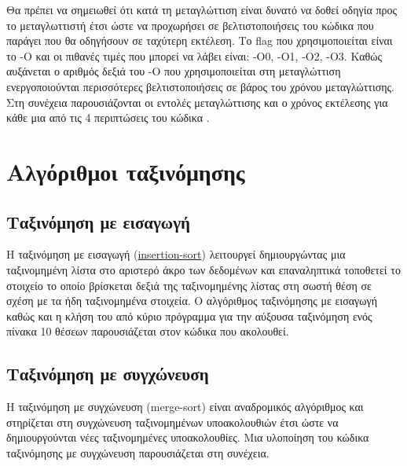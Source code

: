 Θα πρέπει να σημειωθεί ότι κατά τη μεταγλώττιση είναι δυνατό να δοθεί οδηγία προς το μεταγλωττιστή έτσι ώστε να προχωρήσει σε βελτιστοποιήσεις του κώδικα που παράγει που θα οδηγήσουν σε ταχύτερη εκτέλεση. Το flag που χρησιμοποιείται είναι το -Ο και οι πιθανές τιμές που μπορεί να λάβει είναι: -Ο0, -Ο1, -Ο2, -Ο3. Καθώς αυξάνεται ο αριθμός δεξιά του -Ο που χρησιμοποιείται στη μεταγλώττιση ενεργοποιούνται περισσότερες βελτιστοποιήσεις σε βάρος του χρόνου μεταγλώττισης. Στη συνέχεια παρουσιάζονται οι εντολές μεταγλώττισης και ο χρόνος εκτέλεσης για κάθε μια από τις 4 περιπτώσεις του κώδικα .




\section{Αλγόριθμοι ταξινόμησης}
\subsection{Ταξινόμηση με εισαγωγή}
Η ταξινόμηση με εισαγωγή (\href{http://rosettacode.org/wiki/Sorting_algorithms/Insertion_sort}{insertion-sort}) λειτουργεί δημιουργώντας μια ταξινομημένη λίστα στο αριστερό άκρο των δεδομένων και επαναληπτικά τοποθετεί το στοιχείο το οποίο βρίσκεται δεξιά της ταξινομημένης λίστας στη σωστή θέση σε σχέση με τα ήδη ταξινομημένα στοιχεία. Ο αλγόριθμος ταξινόμησης με εισαγωγή καθώς και η κλήση του από κύριο πρόγραμμα για την αύξουσα ταξινόμηση ενός πίνακα 10 θέσεων παρουσιάζεται στον κώδικα που ακολουθεί.







\subsection{Ταξινόμηση με συγχώνευση}
Η ταξινόμηση με συγχώνευση (merge-sort) είναι αναδρομικός αλγόριθμος και στηρίζεται στη συγχώνευση ταξινομημένων υποακολουθιών έτσι ώστε να δημιουργούνται νέες ταξινομημένες υποακολουθίες. Μια υλοποίηση του κώδικα ταξινόμησης με συγχώνευση παρουσιάζεται στη συνέχεια. 



